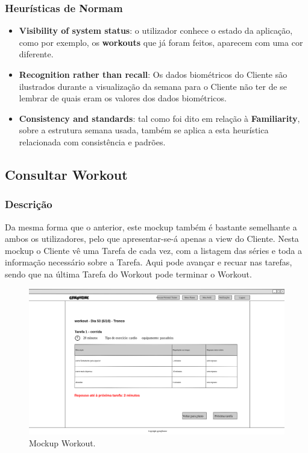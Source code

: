 \subsubsection{Heurísticas de Normam}
\begin{itemize}
    \item \textbf{Visibility of system status}: o utilizador conhece o estado da aplicação, como por exemplo, os \textbf{workouts} que já foram feitos, aparecem com uma cor diferente. 
    \item \textbf{Recognition rather than recall}: Os dados biométricos do Cliente são ilustrados durante a visualização da semana para o Cliente não ter de se lembrar de quais eram os valores dos dados biométricos.
    \item \textbf{Consistency and standards}: tal como foi dito em relação à \textbf{Familiarity}, sobre a estrutura semana usada, também se aplica a esta heurística relacionada com consistência e padrões.
\end{itemize}

\subsection{Consultar Workout}
\label{subsec:workout}

\subsubsection{Descrição}
\hspace{5mm} Da mesma forma que o anterior, este mockup também é bastante semelhante a ambos os utilizadores, pelo que apresentar-se-á apenas a view do Cliente. Nesta mockup o Cliente vê uma Tarefa de cada vez, com a listagem das séries e toda a informação necessário sobre a Tarefa. Aqui pode avançar e recuar nas tarefas, sendo que na última Tarefa do Workout pode terminar o Workout.

\begin{figure}[H]
    \centering
    \includegraphics[scale=0.25]{images/mockups/cliente_plano_tarefa_1.png}
    \caption{Mockup Workout.}
    \label{fig:mockupworkout}
\end{figure}

